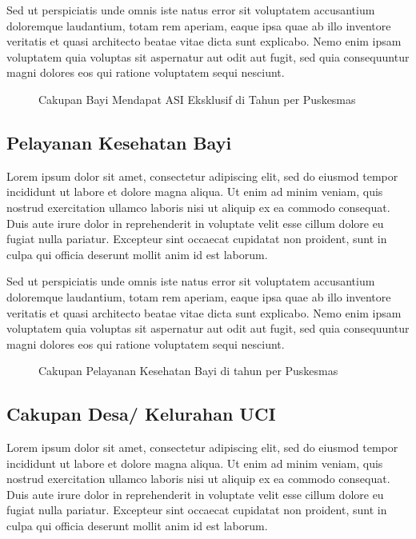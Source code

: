 Sed ut perspiciatis unde omnis iste natus error sit voluptatem accusantium doloremque laudantium, totam rem aperiam, eaque ipsa quae ab illo inventore veritatis et quasi architecto beatae vitae dicta sunt explicabo. Nemo enim ipsam voluptatem quia voluptas sit aspernatur aut odit aut fugit, sed quia consequuntur magni dolores eos qui ratione voluptatem sequi nesciunt.

\begin{figure}[H]
  \centering
  \caption{Cakupan Bayi Mendapat ASI Eksklusif di \namaKabupaten Tahun \tP per Puskesmas}
  \label{fig:Cakupan-Bayi-ASI-Eksklusif}
\end{figure}

\subsection{Pelayanan Kesehatan Bayi}
Lorem ipsum dolor sit amet, consectetur adipiscing elit, sed do eiusmod tempor incididunt ut labore et dolore magna aliqua. Ut enim ad minim veniam, quis nostrud exercitation ullamco laboris nisi ut aliquip ex ea commodo consequat. Duis aute irure dolor in reprehenderit in voluptate velit esse cillum dolore eu fugiat nulla pariatur. Excepteur sint occaecat cupidatat non proident, sunt in culpa qui officia deserunt mollit anim id est laborum.

Sed ut perspiciatis unde omnis iste natus error sit voluptatem accusantium doloremque laudantium, totam rem aperiam, eaque ipsa quae ab illo inventore veritatis et quasi architecto beatae vitae dicta sunt explicabo. Nemo enim ipsam voluptatem quia voluptas sit aspernatur aut odit aut fugit, sed quia consequuntur magni dolores eos qui ratione voluptatem sequi nesciunt.

\begin{figure}[H]
    \centering
    \caption{Cakupan Pelayanan Kesehatan Bayi di \namaKabupaten tahun \tP per Puskesmas}
    \label{fig:Cakupan-Pelayanan-Kesehatan-Bayi}
\end{figure}

\subsection{Cakupan Desa/ Kelurahan UCI}
Lorem ipsum dolor sit amet, consectetur adipiscing elit, sed do eiusmod tempor incididunt ut labore et dolore magna aliqua. Ut enim ad minim veniam, quis nostrud exercitation ullamco laboris nisi ut aliquip ex ea commodo consequat. Duis aute irure dolor in reprehenderit in voluptate velit esse cillum dolore eu fugiat nulla pariatur. Excepteur sint occaecat cupidatat non proident, sunt in culpa qui officia deserunt mollit anim id est laborum.

